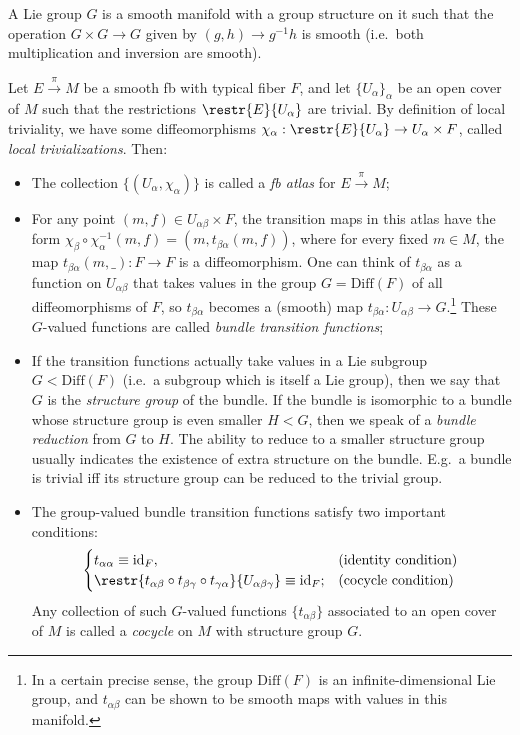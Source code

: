 \documentclass[english,letterpaper]{article}%
\numberwithin{equation}{section}
\numberwithin{figure}{section}
\numberwithin{table}{section}
\theoremstyle{definition}
\theoremstyle{definition}
\theoremstyle{definition}
\theoremstyle{plain}
\theoremstyle{plain}
\theoremstyle{plain}
\theoremstyle{plain}
\theoremstyle{remark}
\theoremstyle{remark}
\DeclareMathOperator{\id}{id}
\begin{document}
\begin{defn}
A Lie group $G$ is a smooth manifold with a group structure on it such that the operation $G\times G\to G$ given by $(g,h)\to g^{-1} h$ is smooth (i.e.\ both multiplication and inversion are smooth).
\end{defn}


\begin{defn}
Let $E\overset{\pi}{\to}M$ be a smooth \gls{fb} with typical fiber $F$, and let $\{U_\alpha\}_\alpha$ be an open cover of $M$ such that the restrictions $\restr{E}{U_\alpha}$ are trivial. By definition of local triviality, we have some diffeomorphisms $\chi_\alpha: \restr{E}{U_\alpha}\to U_\alpha\times F$, called \emph{local trivializations}. Then:
\begin{itemize}
    \item The collection $\{(U_\alpha,\chi_\alpha)\}$ is called a \emph{\gls{fb} atlas} for $E\overset{\pi}{\to}M$;
    \item For any point $(m,f)\in U_{\alpha\beta}\times F$, the transition maps in this atlas have the form $\chi_\beta\circ\chi_\alpha^{-1} (m,f)=(m, t_{\beta\alpha}(m,f))$, where for every fixed $m\in M$, the map $t_{\beta\alpha}(m,\_):F\to F$ is a diffeomorphism. One can think of $t_{\beta\alpha}$ as a function on $U_{\alpha\beta}$ that takes values in the group $G=\mathrm{Diff}(F)$ of all diffeomorphisms of $F$, so $t_{\beta\alpha}$ becomes a (smooth) map $t_{\beta\alpha}:U_{\alpha\beta}\to G$.\footnote{In a certain precise sense, the group $\mathrm{Diff}(F)$ is an infinite-dimensional Lie group, and $t_{\alpha\beta}$ can be shown to be smooth maps with values in this manifold.} These $G$-valued functions are called \textit{bundle transition functions};
    \item If the transition functions actually take values in a Lie subgroup $G<\mathrm{Diff}(F)$ (i.e.\ a subgroup which is itself a Lie group), then we say that $G$ is the \emph{structure group} of the bundle. If the bundle is isomorphic to a bundle whose structure group is even smaller $H<G$, then we speak of a \emph{bundle reduction} from $G$ to $H$. The ability to reduce to a smaller structure group usually indicates the existence of extra structure on the bundle. E.g.\ a bundle is trivial iff its structure group can be reduced to the trivial group.
    
    \item The group-valued bundle transition functions satisfy two important conditions:
    \[
    \begin{cases}
    t_{\alpha\alpha}\equiv\id_{F}, & \text{(identity condition)}\\
    \restr{t_{\alpha\beta}\circ t_{\beta\gamma}\circ t_{\gamma\alpha}}{U_{\alpha\beta\gamma}}\equiv\id_{F}; & \text{(cocycle condition)}
    \end{cases}
    \]
    Any collection of such $G$-valued functions $\{t_{\alpha\beta}\}$ associated to an open cover of $M$ is called a \emph{cocycle} on $M$ with structure group $G$.
    

\end{itemize}
\end{defn}
\end{document}
